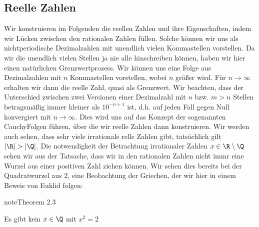 \documentclass[letterpaper,10pt,english]{jupyterBook}
\begin{document}
\subsection{Reelle Zahlen}
\label{\detokenize{grundlagen/zahlensysteme:reelle-zahlen}}
Wir konstruieren im Folgenden die reellen Zahlen und ihre Eigenschaften, indem wir Lücken zwischen den rationalen Zahlen füllen. Solche können wir uns als nichtperiodische Dezimalzahlen mit unendlich vielen Kommastellen vorstellen. Da wir die unendlich vielen Stellen ja nie alle hinschreiben können, haben wir hier einen natürlichen Grenzwertprozess. Wir können uns eine Folge aus Dezimalzahlen mit \(n\) Kommastellen vorstellen, wobei \(n\) größer wird. Für \(n \rightarrow \infty\) erhalten wir dann die reelle Zahl, quasi als Grenzwert. Wir beachten, dass der Unterschied zwischen zwei Versionen einer Dezimalzahl mit \(n\) bzw. \(m > n\) Stellen betragsmäßig immer kleiner als \(10^{-n+1}\) ist, d.h. auf jeden Fall gegen Null konvergiert mit \(n \rightarrow \infty\). Dies wird uns auf das Konzept der sogenannten Cauchy\sphinxhyphen{}Folgen führen, über die wir reelle Zahlen dann konstruieren. Wir werden auch sehen, dass sehr viele irrationale relle Zahlen gibt, tatsächlich gilt \(|\R| > |\Q|\).
Die notwendigkeit der Betrachtung irrationaler Zahlen \(x \in \R \setminus \Q\) sehen wir aus der Tatsache, dass wir in den rationalen Zahlen nicht immr eine Wurzel aus einer positiven Zahl ziehen können. Wir sehen dies bereits bei der Quadratwurzel aus \(2\), eine Beobachtung der Griechen, der wir hier in einem Beweis von Euklid folgen:
\label{grundlagen/zahlensysteme:theorem-12}
\begin{sphinxadmonition}{note}{Theorem 2.3}



Es gibt kein \(x \in \Q\) mit \(x^2 = 2\)
\end{sphinxadmonition}
\end{document}
